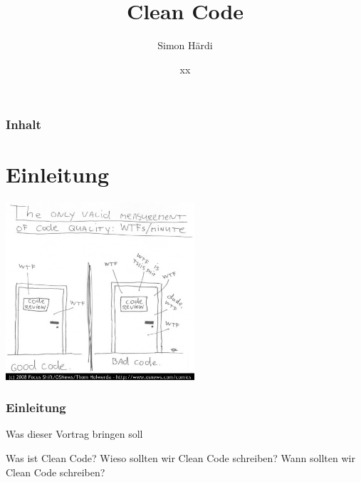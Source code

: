 \documentclass[handout]{beamer}
\title[CleanCode]{Clean Code}
\author{Simon Härdi}
\institute{Institute for Computational Engineering}
\date{xx}
\begin{document}
{
\begin{frame}
\maketitle
\end{frame}
}

\begin{frame}
    \frametitle{Inhalt}
    \tableofcontents
\end{frame}

\section{Einleitung}
\begin{frame}
    \begin{center}
        \includegraphics[width=7cm]{wtfm.jpg}
    \end{center}
\end{frame}
\begin{frame}
\frametitle{Einleitung}
Was dieser Vortrag bringen soll
    \begin{outline}
        \1 Was ist Clean Code?
        \1 Wieso sollten wir Clean Code schreiben?
        \1 Wann sollten wir Clean Code schreiben?
    \end{outline}
\end{frame}
\end{document}

